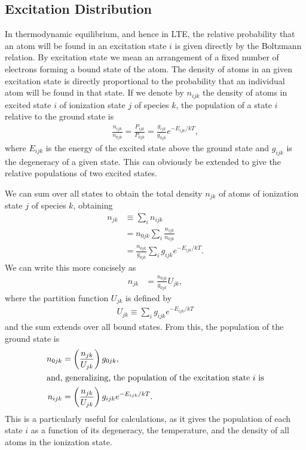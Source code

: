 \newslide

\subsection{Excitation Distribution}

In thermodynamic equilibrium, and hence in LTE, the relative probability
that an atom will be found in an excitation state $i$ is given directly
by the Boltzmann relation. By excitation state we mean an arrangement of
a fixed number of electrons forming a bound state of the atom. The
density of atoms in an given excitation state is directly proportional
to the probability that an individual atom will be found in that state.
If we denote by $n_{ijk}$ the density of atoms in excited state $i$ of
ionization state $j$ of species $k$, the population of a
state $i$ relative to the ground state is
\begin{align}
\frac{n_{ijk}}{n_{0jk}}
=
\frac{P_{ijk}}{P_{0jk}}
=
\frac{g_{ijk}}{g_{0jk}}e^{-E_{ijk}/kT},
\end{align}
where $E_{ijk}$ is the energy of the excited state above the
ground state and $g_{ijk}$ is the degeneracy of a given
state. This can obviously be extended to give the relative
populations of two excited states.

We can sum over all states to obtain the total density
$n_{jk}$ of atoms of ionization state $j$ of species $k$, obtaining
\begin{align}
n_{jk} &\equiv \sum_i n_{ijk}\\
&=n_{0jk} \sum_i \frac{n_{ijk}}{n_{0jk}}\\
&= \frac{n_{0jk}}{g_{0jk}} \sum_i g_{ijk} e^{-E_{ijk}/kT}.
\end{align}
We can write this more concisely as
\begin{align}
n_{jk} &= \frac{n_{0jk}}{g_{0jk}} U_{jk},
\end{align}
where the partition function $U_{jk}$ is defined by
\begin{align}
U_{jk} \equiv \sum_i g_{ijk} e^{-E_{ijk}/kT}
\end{align}
and the sum extends over all bound states. From this, the
population of the ground state is
\begin{align}
n_{0jk} &= \left(\frac{n_{jk}}{U_{jk}}\right) g_{0jk},\\
\intertext{and, generalizing, the population of the excitation state $i$ is}
n_{ijk} &= \left(\frac{n_{jk}}{U_{jk}}\right) g_{ijk} e^{-E_{ijk}/kT}.
\eqlabel{boltzmann-n-ijk}
\end{align}
This is a particularly useful for calculations, as it gives the
population of each state $i$ as a function of its degeneracy, the
temperature, and the density of all atoms in the ionization state.

